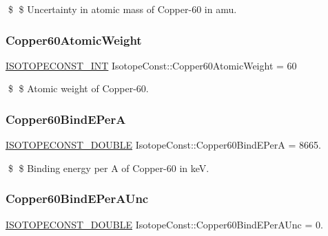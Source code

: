 \$ \$ Uncertainty in atomic mass of Copper-\/60 in amu. \mbox{\label{group___isotope_const-_copper-_cu60_ga394ad9dcf8b55547928ec60d518473c4}} 
\subsubsection{\texorpdfstring{Copper60\+Atomic\+Weight}{Copper60AtomicWeight}}
{\footnotesize\ttfamily \mbox{\hyperlink{group___isotope_const-_macros_ga5f18360b3e99483a35c32d789e62621c}{I\+S\+O\+T\+O\+P\+E\+C\+O\+N\+S\+T\+\_\+\+I\+NT}} Isotope\+Const\+::\+Copper60\+Atomic\+Weight = 60}

\$ \$ Atomic weight of Copper-\/60. \mbox{\label{group___isotope_const-_copper-_cu60_ga9e7f8c7e57c4f4911e5aa2245f0717ba}} 
\subsubsection{\texorpdfstring{Copper60\+Bind\+E\+PerA}{Copper60BindEPerA}}
{\footnotesize\ttfamily \mbox{\hyperlink{group___isotope_const-_macros_ga8f45a7272ce02c0b4c65c44636ed719a}{I\+S\+O\+T\+O\+P\+E\+C\+O\+N\+S\+T\+\_\+\+D\+O\+U\+B\+LE}} Isotope\+Const\+::\+Copper60\+Bind\+E\+PerA = 8665.}

\$ \$ Binding energy per A of Copper-\/60 in keV. \mbox{\label{group___isotope_const-_copper-_cu60_ga16ab0c679c4c4ee64b7a3448dedade4b}} 
\subsubsection{\texorpdfstring{Copper60\+Bind\+E\+Per\+A\+Unc}{Copper60BindEPerAUnc}}
{\footnotesize\ttfamily \mbox{\hyperlink{group___isotope_const-_macros_ga8f45a7272ce02c0b4c65c44636ed719a}{I\+S\+O\+T\+O\+P\+E\+C\+O\+N\+S\+T\+\_\+\+D\+O\+U\+B\+LE}} Isotope\+Const\+::\+Copper60\+Bind\+E\+Per\+A\+Unc = 0.}

